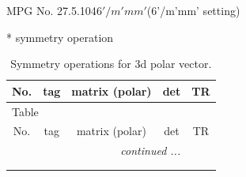 \documentclass[fleqn,8pt]{jsarticle}
\begin{document}
\setcounter{MaxMatrixCols}{32}

\renewcommand{\tablename}{Table~}
\renewcommand{\figurename}{Figure~}
\begin{center}
\LARGE
MPG No. 27.5.104\quad$6'/m'mm'$\quad(6'/m'mm' setting)
\end{center}
* symmetry operation
\renewcommand{\arraystretch}{1.3}
\begin{longtable}{ccccc}
\caption{Symmetry operations for 3d polar vector.}
 \\
 \hline \hline
No. & tag & matrix (polar) & det & TR \\ \hline \endfirsthead

\multicolumn{4}{l}{\tablename\ \thetable{}} \\
 \hline \hline
No. & tag & matrix (polar) & det & TR \\ \hline \endhead

 \hline \hline
\multicolumn{4}{r}{\footnotesize\it continued ...} \\ \endfoot

 \hline \hline
\multicolumn{4}{r}{} \\ \endlastfoot


\end{longtable}
\end{document}
